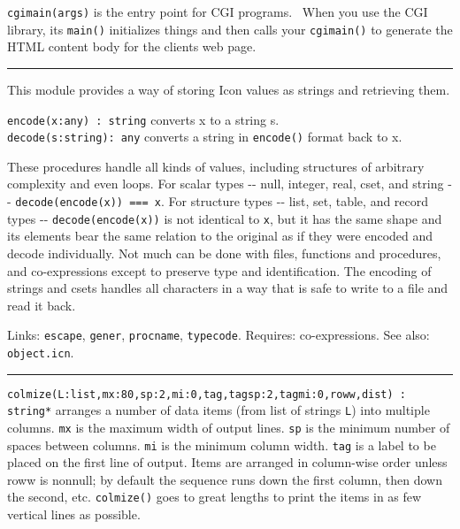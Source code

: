 \texttt{cgimain(args)} is the entry point for CGI programs. \ When you
use the CGI library, its \texttt{main()} initializes things and then
calls your \texttt{cgimain()} to generate the HTML content body for the
client{\textquotesingle}s web page. 

\vspace{0.25cm}\hrule{}

This module provides a way of storing Icon values as strings and
retrieving them.

\texttt{encode(x:any) : string} converts x to a string s.\\
\texttt{decode(s:string): any} converts a string in \texttt{encode()}
format back to x.

These procedures handle all kinds of values, including structures of
arbitrary complexity and even loops. For scalar types -{}- null,
integer, real, cset, and string -{}- \texttt{decode(encode(x)) === x}.
For structure types -{}- list, set, table, and record types -{}-
\texttt{decode(encode(x))} is not identical to \texttt{x}, but it has
the same {\textquotedbl}shape{\textquotedbl} and its elements bear the
same relation to the original as if they were encoded and decode
individually. Not much can be done with files, functions and
procedures, and co-expressions except to preserve type and
identification. The encoding of strings and csets handles all
characters in a way that is safe to write to a file and read it back.

Links: \texttt{escape}, \texttt{gener}, \texttt{procname},
\texttt{typecode}. Requires: co-expressions. See also:
\texttt{object.icn}. 

\vspace{0.25cm}\hrule{}

\texttt{colmize(L:list,mx:80,sp:2,mi:0,tag,tagsp:2,tagmi:0,roww,dist) :
string*} arranges a number of data items (from list of strings
\texttt{L}) into multiple columns. \texttt{mx} is the maximum width of
output lines. \texttt{sp} is the minimum number of spaces between
columns. \texttt{mi} is the minimum column width. \texttt{tag} is a
label to be placed on the first line of output. Items are arranged in
column-wise order unless roww is nonnull; by default the sequence runs
down the first column, then down the second, etc. \texttt{colmize()}
goes to great lengths to print the items in as few vertical lines as
possible.


